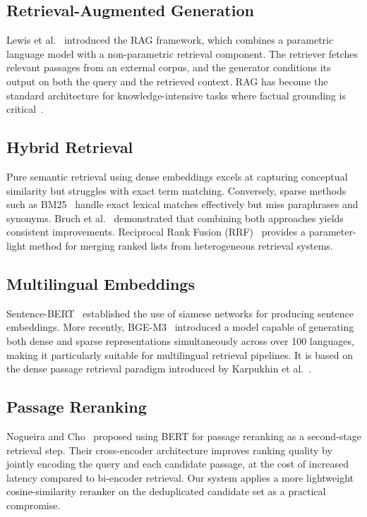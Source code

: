 \documentclass[12pt, a4paper]{article}
\begin{document}
\subsection{Retrieval-Augmented Generation}

Lewis et al.~\cite{lewis2020rag} introduced the RAG framework, which combines
a parametric language model with a non-parametric retrieval component.
The retriever fetches relevant passages from an external corpus, and the
generator conditions its output on both the query and the retrieved context.
RAG has become the standard architecture for knowledge-intensive tasks where
factual grounding is critical~\cite{gao2024ragsurvey}.

\subsection{Hybrid Retrieval}

Pure semantic retrieval using dense embeddings excels at capturing conceptual
similarity but struggles with exact term matching. Conversely, sparse methods
such as BM25~\cite{robertson2009bm25} handle exact lexical matches effectively
but miss paraphrases and synonyms. Bruch et al.~\cite{bruch2022fusion}
demonstrated that combining both approaches yields consistent improvements.
Reciprocal Rank Fusion (RRF)~\cite{cormack2009rrf} provides a parameter-light
method for merging ranked lists from heterogeneous retrieval systems.

\subsection{Multilingual Embeddings}

Sentence-BERT~\cite{reimers2019sbert} established the use of siamese networks
for producing sentence embeddings. More recently, BGE-M3~\cite{chen2024bgem3}
introduced a model capable of generating both dense and sparse representations
simultaneously across over 100 languages, making it particularly suitable for
multilingual retrieval pipelines. It is based on the dense passage retrieval
paradigm introduced by Karpukhin et al.~\cite{karpukhin2020dpr}.

\subsection{Passage Reranking}

Nogueira and Cho~\cite{nogueira2019rerank} proposed using BERT for passage
reranking as a second-stage retrieval step. Their cross-encoder architecture
improves ranking quality by jointly encoding the query and each candidate
passage, at the cost of increased latency compared to bi-encoder retrieval.
Our system applies a more lightweight cosine-similarity reranker on the
deduplicated candidate set as a practical compromise.
\end{document}
